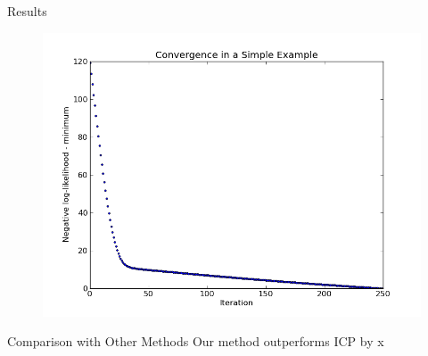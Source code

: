 \documentclass[final]{beamer}
\begin{document}
\begin{frame}{}
\begin{textblock}{27}
\begin{block}{Results}
\begin{figure}
\includegraphics[width=8in]{likelihood.png}
\end{figure}
\end{block}


\begin{block}{Comparison with Other Methods}
Our method outperforms ICP by x%


\end{block}
\end{textblock}
\end{frame}
\end{document}
